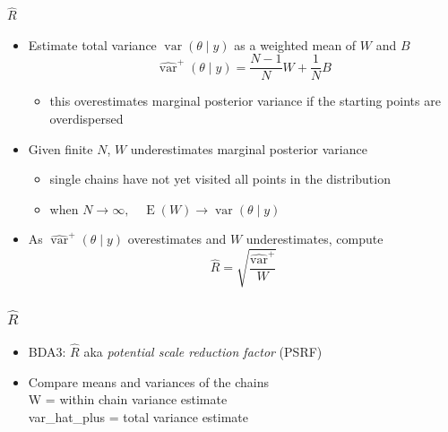 \documentclass[finnish,english,t]{beamer}
\renewcommand{\emph}[1]{\textcolor{navyblue}{#1}}
\DeclareMathOperator{\E}{E}
\DeclareMathOperator{\var}{var}
\begin{document}
\begin{frame}{$\widehat{R}$}

  \begin{itemize}
  \item Estimate total variance
    $\var(\theta \mid y)$ as a weighted mean of $W$ and $B$
    \begin{equation*}
      \widehat{\var}^{+}(\theta \mid y) = \frac{N-1}{N}W+\frac{1}{N}B
    \end{equation*}
    \vspace{-0.5\baselineskip}
    \begin{itemize}
    \item this \emph{overestimates} marginal posterior variance if the
      starting points are overdispersed
    \end{itemize}
    \vspace{0.5\baselineskip}
  \item<2-> Given finite $N$, $W$ \emph{underestimates} marginal posterior variance
    \begin{itemize}
    \item single chains have not yet visited all points in the distribution
    \item when $N\rightarrow\infty, \quad \E(W)\rightarrow \var(\theta \mid y)$
    \end{itemize}
    \vspace{0.5\baselineskip}
  \item<3-> As $\widehat{\var}^{+}(\theta \mid y)$ overestimates and $W$ underestimates,
    compute
    \begin{equation*}
      \widehat{R}=\sqrt{\frac{\widehat{\var}^{+}}{W}}
    \end{equation*}
\end{itemize}  

\end{frame}

\begin{frame}[fragile]
  \frametitle{$\widehat{R}$}

  \begin{itemize}
  \item BDA3: $\widehat{R}$ aka {\em potential scale reduction factor} (PSRF)
  \item Compare means and variances of the chains\\
    W = within chain variance estimate\\
    var\_hat\_plus = total variance estimate\\
    \vspace{1\baselineskip}
  \end{itemize}  

\end{frame}
\end{document}
